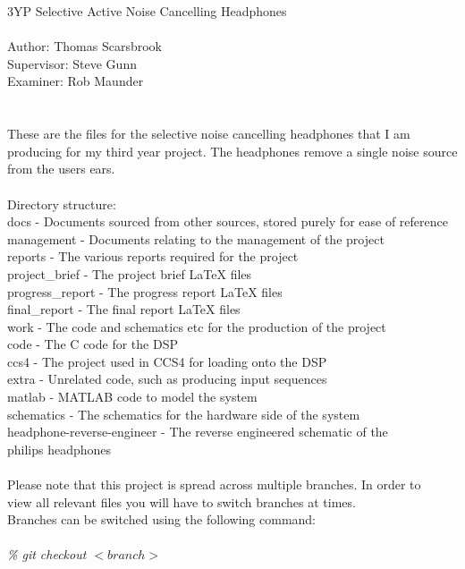 3YP Selective Active Noise Cancelling Headphones
\\
\\
Author:		Thomas Scarsbrook\\
Supervisor:	Steve Gunn\\
Examiner:	Rob Maunder\\
\\
\\
These are the files for the selective noise cancelling headphones that I am
producing for my third year project. The headphones remove a single noise
source from the users ears.
\\
\\
Directory structure:\\
docs - Documents sourced from other sources, stored purely for ease of reference\\
management - Documents relating to the management of the project\\
reports - The various reports required for the project\\
\indent	project\_brief - The project brief LaTeX files\\
\indent	progress\_report - The progress report LaTeX files\\
\indent	final\_report - The final report LaTeX files\\
work - The code and schematics etc for the production of the project\\
\indent	code - The C code for the DSP\\
\indent	ccs4 - The project used in CCS4 for loading onto the DSP\\
\indent	extra - Unrelated code, such as producing input sequences\\
\indent	matlab - MATLAB code to model the system\\
\indent	schematics - The schematics for the hardware side of the system\\
\indent	headphone-reverse-engineer - The reverse engineered schematic of the\\
\indent	\indent			     philips headphones
\\
\\
Please note that this project is spread across multiple branches. In order to\\
view all relevant files you will have to switch branches at times.\\
Branches can be switched using the following command:
\\
\\
\emph{\% git checkout $<branch>$}
